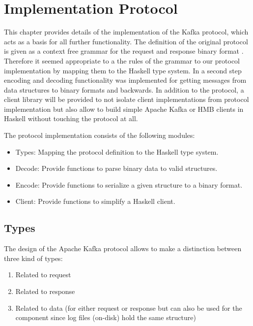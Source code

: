 \chapter{Implementation Protocol} 
\label{sec-protocol} 

This chapter provides details of the implementation of the Kafka protocol, which
acts as a basis for all further functionality. The definition of the original
protocol is given as a context free grammar for the request and response binary
format \cite{kafka-protocol}. Therefore it seemed appropriate to a the rules of the grammar to our
protocol implementation by mapping them to the Haskell type system. In a second
step encoding and decoding functionality was implemented for getting messages
from data structures to binary formats and backwards. In addition to the protocol,
a client library will be provided to not isolate client implementations from
protocol implementation but also allow to build simple Apache Kafka or HMB
clients in Haskell without touching the protocol at all.

The protocol implementation consists of the following modules: 
\begin{itemize}
    \item {Types: Mapping the protocol definition to the Haskell type system. }
    \item {Decode: Provide functions to parse binary data to valid structures. }
    \item {Encode: Provide functions to serialize a given structure to a binary
        format. }
    \item {Client: Provide functions to simplify a Haskell client.}
\end{itemize}

\section{Types}

The design of the Apache Kafka protocol allows to make a distinction between
three kind of types:

\begin{enumerate}
  \item Related to request
  \item Related to response
  \item Related to data (for either request or response but can also be used for
      the  component since log
      files (on-disk) hold the same structure) 
\end{enumerate}

